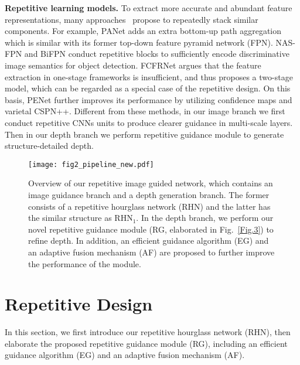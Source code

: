 \documentclass[runningheads]{llncs}
\begin{document}
\noindent \textbf{Repetitive learning models.} To extract more accurate and abundant feature representations, many approaches~\cite{ren2015faster,cai2018cascade,liu2020cbnet,qiao2021detectors} propose to repeatedly stack similar components. For example, PANet \cite{liu2018path} adds an extra bottom-up path aggregation which is similar with its former top-down feature pyramid network (FPN). NAS-FPN \cite{ghiasi2019fpn} and BiFPN \cite{tan2020efficientdet} conduct repetitive blocks to sufficiently encode discriminative image semantics for object detection. FCFRNet \cite{liu2021fcfr} argues that the feature extraction in one-stage frameworks is insufficient, and thus proposes a two-stage model, 
which can be regarded as a special case of the repetitive design. On this basis, PENet \cite{hu2020PENet} further improves its performance by utilizing confidence maps and varietal CSPN++.
Different from these methods, in our image branch we first conduct repetitive CNNs units to produce clearer guidance in multi-scale layers. Then in our depth branch we perform repetitive guidance module to generate structure-detailed depth.

\begin{figure}[t]
  \centering
  \texttt{[image: fig2\_pipeline\_new.pdf]}\\
  \caption{Overview of our repetitive image guided network, which contains an image guidance branch and a depth generation branch. The former consists of a repetitive hourglass network (RHN) and the latter has the similar structure as RHN$_1$. In the depth branch, we perform our novel repetitive guidance module (RG, elaborated in Fig.~\ref{Fig.3}) to refine depth. In addition, an efficient guidance algorithm (EG) and an adaptive fusion mechanism (AF) are proposed to further improve the performance of the module.}\label{Fig.2}
\end{figure}



\section{Repetitive Design}
In this section, we first introduce our repetitive hourglass network (RHN), then elaborate the proposed repetitive guidance module (RG), including an efficient guidance algorithm (EG) and an adaptive fusion mechanism (AF).
\end{document}
